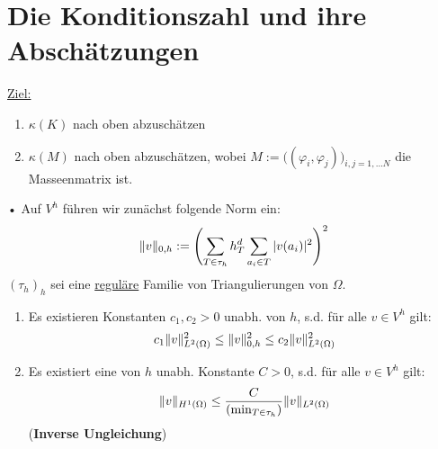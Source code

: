 \section{Die Konditionszahl und ihre Abschätzungen}
\underline{Ziel:} 
\begin{enumerate}
  \item $\kappa (K)$ nach oben abzuschätzen
  \item $\kappa (M)$ nach oben abzuschätzen, wobei $M:= \big((\varphi_i,\varphi_j)\big)_{i,j=1,\dots N}$ die Masseenmatrix ist.
\end{enumerate}•
Auf $V^h$ führen wir zunächst folgende Norm ein:
\[ \|v\|_{0,h} := \left( \sum_{T \in \tau_h} h^d_T \sum_{a_i \in T} |v(a_i)|^2 \right)^2 \]
$(\tau_h)_h$ sei eine \underline{reguläre} Familie von Triangulierungen von $\Omega$.

\begin{satz}
  \begin{enumerate}
    \item
      Es existieren Konstanten $c_1,c_2 >0$ unabh. von $h$, s.d. für alle $v \in V^h$ gilt:
      \[ c_1 \|v\|^2_{L^2(\Omega)} \leq \|v\|^2_{0,h} \leq c_2 \|v\|^2_{L^2(\Omega)} \]
    \item
      Es existiert eine von $h$ unabh. Konstante $C>0$, s.d. für alle $v \in V^h$ gilt:
      \[ \|v\|_{H^1(\Omega)} \leq \frac{C}{(\min_{T \in \tau_h})} \|v\|_{L^2(\Omega)} \]
      (\textbf{Inverse Ungleichung})
  \end{enumerate}
\end{satz}


